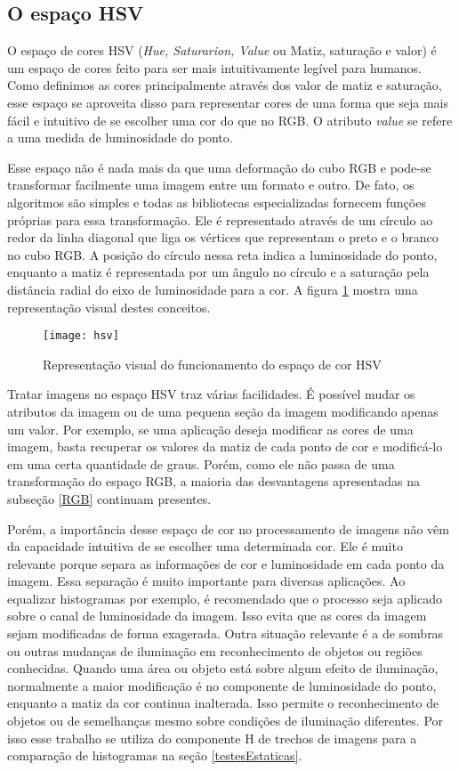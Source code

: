      \subsection{O espaço HSV}\label{HSV}

     O espaço de cores HSV (\textit{Hue, Saturarion, Value} ou Matiz, saturação e valor) é um espaço de cores feito para ser mais intuitivamente legível para humanos. Como definimos as cores principalmente através dos valor de matiz e saturação, esse espaço se aproveita disso para representar cores de uma forma que seja mais fácil e intuitivo de se escolher uma cor do que no RGB. O atributo \textit{value} se refere a uma medida de luminosidade do ponto.

     Esse espaço não é nada mais da que uma deformação do cubo RGB e pode-se transformar facilmente uma imagem entre um formato e outro. De fato, os algoritmos são simples e todas as bibliotecas especializadas fornecem funções próprias para essa transformação. Ele é representado através de um círculo ao redor da linha diagonal que liga os vértices que representam o preto e o branco no cubo RGB. A posição do círculo nessa reta indica a luminosidade do ponto, enquanto a matiz é representada por um ângulo no círculo e a saturação pela distância radial do eixo de luminosidade para a cor. A figura \ref{figConeHSV} mostra uma representação visual destes conceitos.
     
     \begin{figure}
     \centering
      \texttt{[image: hsv]}
      \caption{Representação visual do funcionamento do espaço de cor HSV}\label{figConeHSV}
    \end{figure}

     
     Tratar imagens no espaço HSV traz várias facilidades. É possível mudar os atributos da imagem ou de uma pequena seção da imagem modificando apenas um valor. Por exemplo, se uma aplicação deseja modificar as cores de uma imagem, basta recuperar os valores da matiz de cada ponto de cor e modificá-lo em uma certa quantidade de graus. Porém, como ele não passa de uma transformação do espaço RGB, a maioria das desvantagens apresentadas na subseção \ref{RGB} continuam presentes.

     Porém, a importância desse espaço de cor no processamento de imagens não vêm da capacidade intuitiva de se escolher uma determinada cor. Ele é muito relevante porque separa as informações de cor e luminosidade em cada ponto da imagem. Essa separação é muito importante para diversas aplicações. Ao equalizar histogramas por exemplo, é recomendado que o processo seja aplicado sobre o canal de luminosidade da imagem. Isso evita que as cores da imagem sejam modificadas de forma exagerada. Outra situação relevante é a de sombras ou outras mudanças de iluminação em reconhecimento de objetos ou regiões conhecidas. Quando uma área ou objeto está sobre algum efeito de iluminação, normalmente a maior modificação é no componente de luminosidade do ponto, enquanto a matiz da cor continua inalterada. Isso permite o reconhecimento de objetos ou de semelhanças mesmo sobre condições de iluminação diferentes. Por isso esse trabalho se utiliza do componente H de trechos de imagens para a comparação de histogramas na seção \ref{testesEstaticas}.
     
